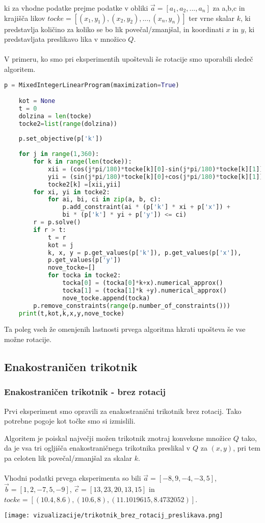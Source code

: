 \documentclass[a4paper, 12pt]{article}
\begin{document}
ki za vhodne podatke prejme podatke v obliki $\vec{a} = [a_1,a_2,...,a_n]$ za a,b,c in krajišča likov $tocke = [(x_1,y_1),(x_2,y_2),...,(x_n,y_n)]$ 
ter vrne skalar $k$, ki predstavlja količino za koliko se bo lik povečal/zmanjšal, in koordinati $x$ in $y$, ki predstavljata preslikavo lika v množico $Q$.
\\~\\
V primeru, ko smo pri eksperimentih upoštevali še rotacije smo uporabili sledeč algoritem.
\begin{lstlisting}[language=Python]
    p = MixedIntegerLinearProgram(maximization=True)

    kot = None
    t = 0
    dolzina = len(tocke)
    tocke2=list(range(dolzina))
    
    p.set_objective(p['k'])
    
    for j in range(1,360):
        for k in range(len(tocke)):
            xii = (cos(j*pi/180)*tocke[k][0]-sin(j*pi/180)*tocke[k][1])
            yii = (sin(j*pi/180)*tocke[k][0]+cos(j*pi/180)*tocke[k][1])
            tocke2[k] =[xii,yii]
        for xi, yi in tocke2:
            for ai, bi, ci in zip(a, b, c):
                p.add_constraint(ai * (p['k'] * xi + p['x']) + 
                bi * (p['k'] * yi + p['y']) <= ci)
        r = p.solve()
        if r > t:
            t = r
            kot = j
            k, x, y = p.get_values(p['k']), p.get_values(p['x']), 
            p.get_values(p['y'])
            nove_tocke=[]
            for tocka in tocke2:
                tocka[0] = (tocka[0]*k+x).numerical_approx()
                tocka[1] = (tocka[1]*k +y).numerical_approx()
                nove_tocke.append(tocka)
        p.remove_constraints(range(p.number_of_constraints()))
    print(t,kot,k,x,y,nove_tocke)
\end{lstlisting}
Ta poleg vseh že omenjenih lastnosti prvega algoritma hkrati upošteva še vse možne rotacije.
\subsection{Enakostraničen trikotnik}
\subsubsection{Enakostraničen trikotnik - brez rotacij}
Prvi eksperiment smo opravili za enakostranični trikotnik brez rotacij. Tako potrebne pogoje kot točke smo si izmislili.
\newline

Algoritem je poiskal največji možen trikotnik znotraj konveksne množice $Q$ tako, da je vsa tri ogljišča enakostraničnega trikotnika preslikal v $Q$ za $(x,y)$,
pri tem pa celoten lik povečal/zmanjšal za skalar $k$.
\\~\\
Vhodni podatki prvega eksperimenta so bili $\vec{a}=[-8,9,-4,-3,5]$, $\vec{b}=[1,2,-7,5,-9]$, $\vec{c}=[13,23,20,13,15]$ in $tocke = [(10.4,8.6),(10.6,8),(11.1019615,8.4732052)]$.
\begin{center}
    \texttt{[image: vizualizacije/trikotnik\_brez\_rotacij\_preslikava.png]}\\
\end{center}
\end{document}
